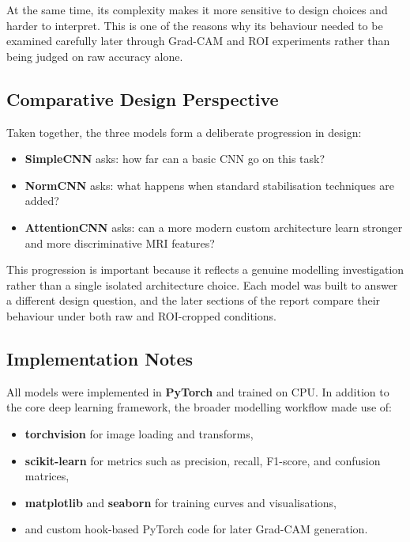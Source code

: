 \documentclass{article}
\begin{document}
At the same time, its complexity makes it more sensitive to design choices and harder to interpret. This is one of the reasons why its behaviour needed to be examined carefully later through Grad-CAM and ROI experiments rather than being judged on raw accuracy alone.

\subsection{Comparative Design Perspective}

Taken together, the three models form a deliberate progression in design:

\begin{itemize}
    \item \textbf{SimpleCNN} asks: how far can a basic CNN go on this task?
    \item \textbf{NormCNN} asks: what happens when standard stabilisation techniques are added?
    \item \textbf{AttentionCNN} asks: can a more modern custom architecture learn stronger and more discriminative MRI features?
\end{itemize}

This progression is important because it reflects a genuine modelling investigation rather than a single isolated architecture choice. Each model was built to answer a different design question, and the later sections of the report compare their behaviour under both raw and ROI-cropped conditions.

\subsection{Implementation Notes}

All models were implemented in \textbf{PyTorch} and trained on CPU. In addition to the core deep learning framework, the broader modelling workflow made use of:
\begin{itemize}
    \item \textbf{torchvision} for image loading and transforms,
    \item \textbf{scikit-learn} for metrics such as precision, recall, F1-score, and confusion matrices,
    \item \textbf{matplotlib} and \textbf{seaborn} for training curves and visualisations,
    \item and custom hook-based PyTorch code for later Grad-CAM generation.
\end{itemize}
\end{document}
